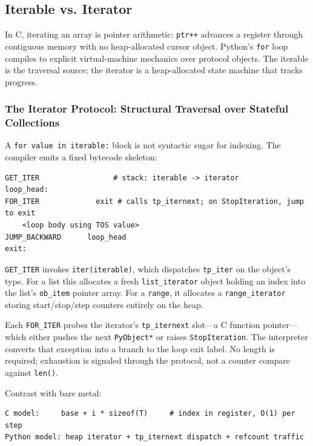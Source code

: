 \subsection{Iterable vs. Iterator}

In C, iterating an array is pointer arithmetic: \texttt{ptr++} advances a register through contiguous memory with no heap-allocated cursor object. Python's \texttt{for} loop compiles to explicit virtual-machine mechanics over protocol objects. The iterable is the traversal source; the iterator is a heap-allocated state machine that tracks progress.

\subsubsection{The Iterator Protocol: Structural Traversal over Stateful Collections}

A \texttt{for value in iterable:} block is not syntactic sugar for indexing. The compiler emits a fixed bytecode skeleton:

\begin{verbatim}
GET_ITER                 # stack: iterable -> iterator
loop_head:
FOR_ITER             exit # calls tp_iternext; on StopIteration, jump to exit
    <loop body using TOS value>
JUMP_BACKWARD      loop_head
exit:
\end{verbatim}

\texttt{GET\_ITER} invokes \texttt{iter(iterable)}, which dispatches \texttt{tp\_iter} on the object's type. For a list this allocates a fresh \texttt{list\_iterator} object holding an index into the list's \texttt{ob\_item} pointer array. For a \texttt{range}, it allocates a \texttt{range\_iterator} storing start/stop/step counters entirely on the heap.

Each \texttt{FOR\_ITER} probes the iterator's \texttt{tp\_iternext} slot---a C function pointer---which either pushes the next \texttt{PyObject*} or raises \texttt{StopIteration}. The interpreter converts that exception into a branch to the loop exit label. No length is required; exhaustion is signaled through the protocol, not a counter compare against \texttt{len()}.

Contrast with bare metal:

\begin{verbatim}
C model:     base + i * sizeof(T)     # index in register, O(1) per step
Python model: heap iterator + tp_iternext dispatch + refcount traffic
\end{verbatim}

